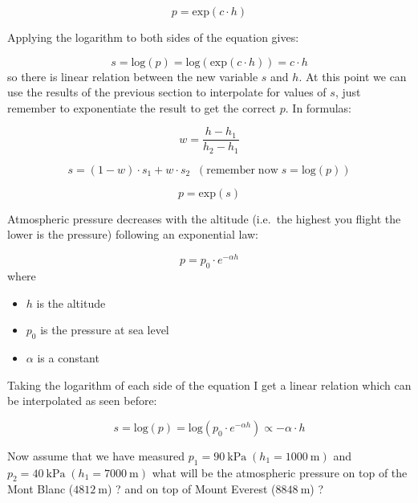 \[p = \mathrm{exp}(c \cdot h)\]

Applying the logarithm to both sides of the equation gives:

\[s = \mathrm{log}(p) = \mathrm{log}(\mathrm{exp}(c \cdot h)) = c \cdot h\]
so there is linear relation between the new variable $s$ and $h$. At this point we can use the results of the previous section to interpolate for values of $s$, just remember to exponentiate the result to get the correct $p$. In formulas:

\[w = \frac{h - h_1}{h_2 - h_1}\]

\[s = (1 - w)\cdot s_1 + w \cdot s_2\;\;(\mathrm{remember \;now }\;s = \mathrm{log}(p))\]

\[p = \mathrm{exp}(s)\]

Atmospheric pressure decreases with the altitude (i.e.~the highest you flight the lower is the pressure) following an exponential law:

\[p = p_0\cdot e^{-\alpha h}\]
where
\begin{itemize}
\tightlist
\item
  \(h\) is the altitude
\item
  \(p_0\) is the pressure at sea level
\item
  \(\alpha\) is a constant
\end{itemize}

Taking the logarithm of each side of the equation I get a linear relation which can be interpolated as seen before:

\[s = \mathrm{log}(p) = \mathrm{log}(p_0\cdot e^{-\alpha h})\propto - \alpha \cdot h\]

Now assume that we have measured
\(p_1 = 90~\mathrm{kPa}\;(h_1 = 1000~\mathrm{m})\) and
\(p_2 = 40~\mathrm{kPa}\;(h_1 = 7000~\mathrm{m})\) what will be the
atmospheric pressure on top of the Mont Blanc (\(4812~\mathrm{m}\)) ? and on top of Mount Everest (\(8848~\mathrm{m}\)) ?

